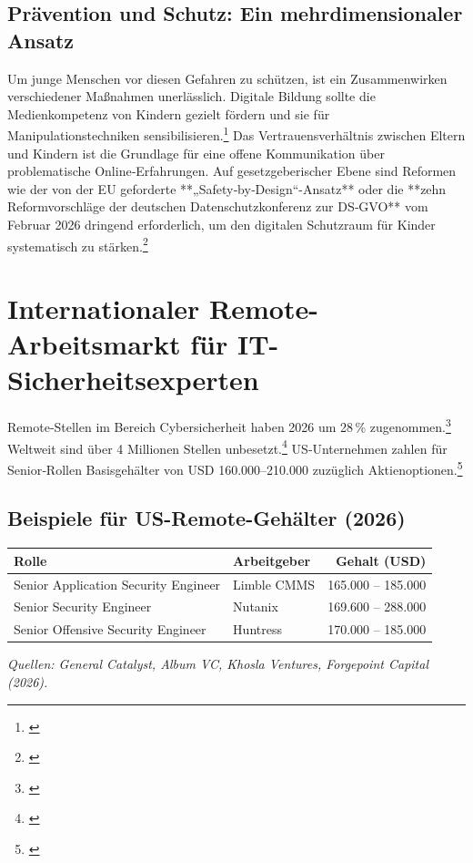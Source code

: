 \documentclass[10pt,a4paper]{article}
\begin{document}
	\subsection{Prävention und Schutz: Ein mehrdimensionaler Ansatz}
	Um junge Menschen vor diesen Gefahren zu schützen, ist ein Zusammenwirken verschiedener Maßnahmen unerlässlich. Digitale Bildung sollte die Medienkompetenz von Kindern gezielt fördern und sie für Manipulationstechniken sensibilisieren.\footnote{\cite{klicksafe}} Das Vertrauensverhältnis zwischen Eltern und Kindern ist die Grundlage für eine offene Kommunikation über problematische Online‑Erfahrungen. Auf gesetzgeberischer Ebene sind Reformen wie der von der EU geforderte **„Safety‑by‑Design“-Ansatz** oder die **zehn Reformvorschläge der deutschen Datenschutzkonferenz zur DS‑GVO** vom Februar 2026 dringend erforderlich, um den digitalen Schutzraum für Kinder systematisch zu stärken.\footnote{\cite{DSK2026, tagesschau2026, Bundesregierung2026, BAG2025}}
	
	\section{Internationaler Remote-Arbeitsmarkt für IT-Sicherheitsexperten}
	
	Remote‑Stellen im Bereich Cybersicherheit haben 2026 um 28\,\% zugenommen.\footnote{\cite{Jobs4BW}} Weltweit sind über 4 Millionen Stellen unbesetzt.\footnote{\cite{EvoTalents}} US‑Unternehmen zahlen für Senior‑Rollen Basisgehälter von USD 160.000–210.000 zuzüglich Aktienoptionen.\footnote{\cite{EvoTalents}}
	
	\subsection{Beispiele für US-Remote-Gehälter (2026)}
	\begin{center}
		\begin{tabular}{@{}l l r@{}}
			\toprule
			\textbf{Rolle} & \textbf{Arbeitgeber} & \textbf{Gehalt (USD)} \\
			\midrule
			Senior Application Security Engineer & Limble CMMS & 165.000 – 185.000 \\
			Senior Security Engineer & Nutanix & 169.600 – 288.000 \\
			Senior Offensive Security Engineer & Huntress & 170.000 – 185.000 \\
			\bottomrule
		\end{tabular}
	\end{center}
	\emph{Quellen: General Catalyst, Album VC, Khosla Ventures, Forgepoint Capital (2026).}
	
\end{document}
